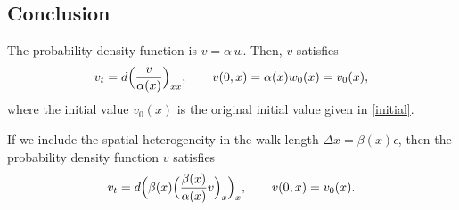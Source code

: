 \documentclass[a4paper,11pt]{article}
\theoremstyle{remark}
\begin{document}
\subsection{Conclusion}

The probability density function is $v=\alpha\, w$. Then, $v$ satisfies
$$
v_t=d\Big({v\over\alpha(x)}\Big)_{xx},\qquad
v(0,x)={\alpha(x)w_0(x)}=v_0(x),
$$
where the initial value $v_0(x)$ is the original initial value given in
\eqref{initial}.

If we include the spatial heterogeneity in the walk length
$\Delta x=\beta(x)\epsilon$, then the probability density function $v$
satisfies
$$
v_t=d\Big(\beta(x)\Big({\beta(x)\over\alpha(x)}v\Big)_x\Big)_x,\qquad
v(0,x)=v_0(x).
$$
\end{document}
